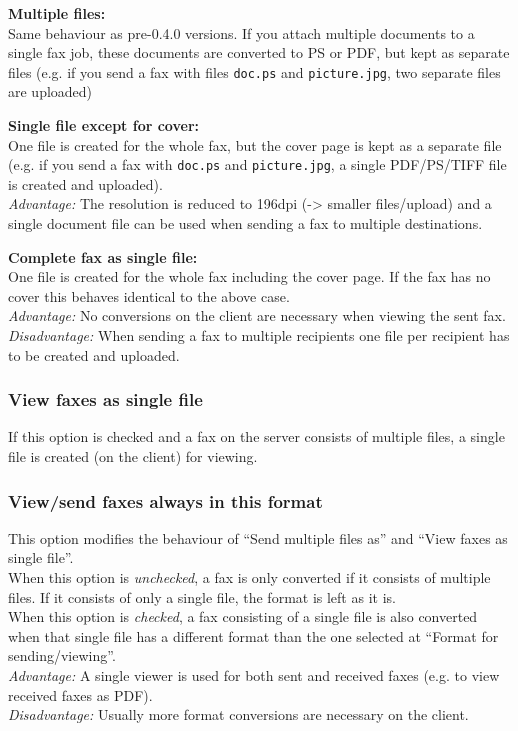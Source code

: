 \documentclass[a4paper,10pt]{scrartcl}
\begin{document}
{\parindent0pt
\textbf{Multiple files:}\\
Same behaviour as pre-0.4.0 versions. If you attach multiple documents to a single fax job, these documents are converted to PS or PDF, but kept as separate files (e.g. if you send a fax with files \texttt{doc.ps} and \texttt{picture.jpg}, two separate files are uploaded)
\medskip

\textbf{Single file except for cover:}\\
One file is created for the whole fax, but the cover page is kept as a separate file (e.g. if you send a fax with \texttt{doc.ps} and \texttt{picture.jpg}, a single PDF/PS/TIFF file is created and uploaded).\\
\textit{Advantage:} The resolution is reduced to 196dpi (-> smaller files/upload) and a single document file can be used when sending a fax to multiple destinations.
\medskip

\textbf{Complete fax as single file:}\\
One file is created for the whole fax including the cover page. If the fax has no cover this behaves identical to the above case.\\
\textit{Advantage:} No conversions on the client are necessary when viewing the sent fax.\\
\textit{Disadvantage:} When sending a fax to multiple recipients one file per recipient has to be created and uploaded.
}

\subsubsection{View faxes as single file}
If this option is checked and a fax on the server consists of multiple files, a single file is created (on the client) for viewing.


\subsubsection{View/send faxes always in this format}
This option modifies the behaviour of ``Send multiple files as'' and ``View faxes as single file''.\\
When this option is \textit{unchecked}, a fax is only converted if it consists of multiple files. If it consists of only a single file, the format is left as it is.\\
When this option is \textit{checked}, a fax consisting of a single file is also converted when that single file has a different format than the one selected at ``Format for sending/viewing''.\\
\textit{Advantage:} A single viewer is used for both sent and received faxes (e.g. to view received faxes as PDF).\\
\textit{Disadvantage:} Usually more format conversions are necessary on the client.
\end{document}
